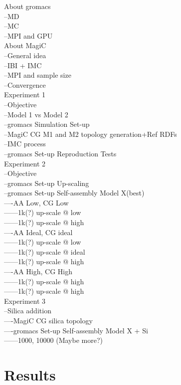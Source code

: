 \documentclass[10pt,a4paper,twoside]{article}
\begin{document}
About gromacs\\
 --MD\\
 --MC\\
 --MPI and GPU\\
About MagiC\\
 --General idea\\
 --IBI + IMC\\
 --MPI and sample size\\
 --Convergence\\
Experiment 1 \\
 --Objective\\
 --Model 1 vs Model 2 \\
 --gromacs Simulation Set-up\\
 --MagiC CG M1 and M2 topology generation+Ref RDFs\\
 --IMC process\\
 --gromacs Set-up Reproduction Tests\\
Experiment 2\\
 --Objective\\
 --gromacs Set-up Up-scaling \\
 --gromacs Set-up Self-assembly Model X(best)\\
  ----AA Low, CG Low\\
   ------1k(?) up-scale @ low\\
   ------1k(?) up-scale @ high\\
  ----AA Ideal, CG ideal\\
   ------1k(?) up-scale @ low\\
   ------1k(?) up-scale @ ideal\\
   ------1k(?) up-scale @ high  \\
  ----AA High, CG High\\
   ------1k(?) up-scale @ high\\
   ------1k(?) up-scale @ high\\
Experiment 3\\
 --Silica addition\\
  ----MagiC CG silica topology \\
  ----gromacs Set-up Self-assembly Model X + Si\\
   ------1000, 10000 (Maybe more?)\\
 
\section{Results}
\end{document}

